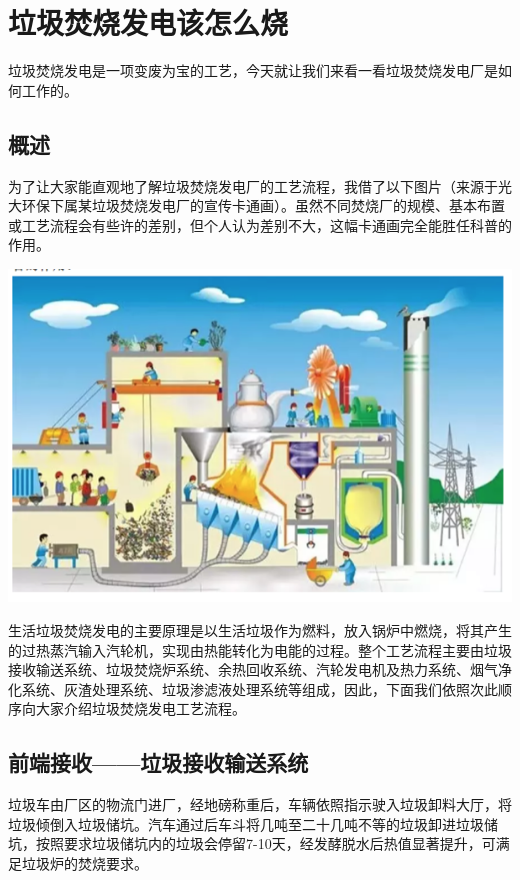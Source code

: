 \documentclass[]{book}
\begin{document}
\section{垃圾焚烧发电该怎么烧}

垃圾焚烧发电是一项变废为宝的工艺，今天就让我们来看一看垃圾焚烧发电厂是如何工作的。

\subsection{概述}

为了让大家能直观地了解垃圾焚烧发电厂的工艺流程，我借了以下图片（来源于光大环保下属某垃圾焚烧发电厂的宣传卡通画）。虽然不同焚烧厂的规模、基本布置或工艺流程会有些许的差别，但个人认为差别不大，这幅卡通画完全能胜任科普的作用。

\includegraphics[width=8.33in]{images/ljfs1}

生活垃圾焚烧发电的主要原理是以生活垃圾作为燃料，放入锅炉中燃烧，将其产生的过热蒸汽输入汽轮机，实现由热能转化为电能的过程。整个工艺流程主要由垃圾接收输送系统、垃圾焚烧炉系统、余热回收系统、汽轮发电机及热力系统、烟气净化系统、灰渣处理系统、垃圾渗滤液处理系统等组成，因此，下面我们依照次此顺序向大家介绍垃圾焚烧发电工艺流程。

\subsection{前端接收------垃圾接收输送系统}

垃圾车由厂区的物流门进厂，经地磅称重后，车辆依照指示驶入垃圾卸料大厅，将垃圾倾倒入垃圾储坑。汽车通过后车斗将几吨至二十几吨不等的垃圾卸进垃圾储坑，按照要求垃圾储坑内的垃圾会停留7-10天，经发酵脱水后热值显著提升，可满足垃圾炉的焚烧要求。
\end{document}
